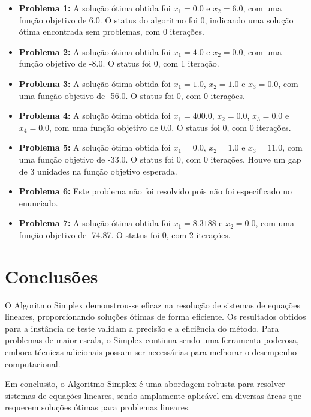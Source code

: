 \documentclass[11pt]{article}
\theoremstyle{definition} \newtheorem{definition}{Definição}
\theoremstyle{definition} \newtheorem{example}{Exemplo}
\begin{document}
{\begin{itemize}
    \item \textbf{Problema 1:} A solução ótima obtida foi \( x_1 = 0.0 \) e \( x_2 = 6.0 \), com uma função objetivo de 6.0. O status do algoritmo foi 0, indicando uma solução ótima encontrada sem problemas, com 0 iterações.
    \item \textbf{Problema 2:} A solução ótima obtida foi \( x_1 = 4.0 \) e \( x_2 = 0.0 \), com uma função objetivo de -8.0. O status foi 0, com 1 iteração.
    \item \textbf{Problema 3:} A solução ótima obtida foi \( x_1 = 1.0 \), \( x_2 = 1.0 \) e \( x_3 = 0.0 \), com uma função objetivo de -56.0. O status foi 0, com 0 iterações.
    \item \textbf{Problema 4:} A solução ótima obtida foi \( x_1 = 400.0 \), \( x_2 = 0.0 \), \( x_3 = 0.0 \) e \( x_4 = 0.0 \), com uma função objetivo de 0.0. O status foi 0, com 0 iterações.
    \item \textbf{Problema 5:} A solução ótima obtida foi \( x_1 = 0.0 \), \( x_2 = 1.0 \) e \( x_3 = 11.0 \), com uma função objetivo de -33.0. O status foi 0, com 0 iterações. Houve um gap de 3 unidades na função objetivo esperada.
    \item \textbf{Problema 6:} Este problema não foi resolvido pois não foi especificado no enunciado.
    \item \textbf{Problema 7:} A solução ótima obtida foi \( x_1 = 8.3188 \) e \( x_2 = 0.0 \), com uma função objetivo de -74.87. O status foi 0, com 2 iterações.
\end{itemize}

}

\section{Conclusões}

{O Algoritmo Simplex demonstrou-se eficaz na resolução de sistemas de equações lineares, proporcionando soluções ótimas de forma eficiente. Os resultados obtidos para a instância de teste validam a precisão e a eficiência do método. Para problemas de maior escala, o Simplex continua sendo uma ferramenta poderosa, embora técnicas adicionais possam ser necessárias para melhorar o desempenho computacional.

Em conclusão, o Algoritmo Simplex é uma abordagem robusta para resolver sistemas de equações lineares, sendo amplamente aplicável em diversas áreas que requerem soluções ótimas para problemas lineares.}
\end{document}

